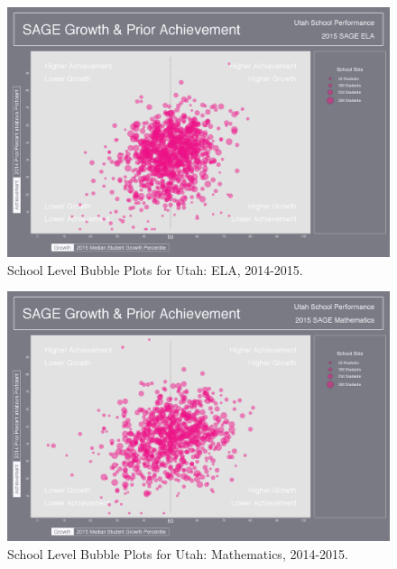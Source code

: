\documentclass[12pt]{article}
\begin{document}
\begin{figure}[htbp]
\centering
\includegraphics{../img/Bubble_Plots/2015/State/Style_1/Utah_2015_ELA_State_Bubble_Plot_(Prior_Achievement).png}
\caption{School Level Bubble Plots for Utah: ELA, 2014-2015.}
\end{figure}

\begin{figure}[htbp]
\centering
\includegraphics{../img/Bubble_Plots/2015/State/Style_1/Utah_2015_Mathematics_State_Bubble_Plot_(Prior_Achievement).png}
\caption{School Level Bubble Plots for Utah: Mathematics, 2014-2015.}
\end{figure}
\end{document}
